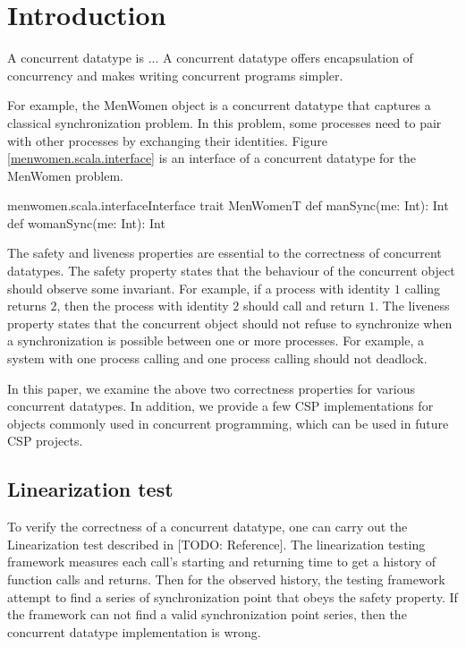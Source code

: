 \documentclass{article}
\begin{document}
\section{Introduction}
A concurrent datatype is ... A concurrent datatype offers encapsulation of concurrency and makes writing concurrent programs simpler. 

For example, the MenWomen object is a concurrent datatype that captures a classical synchronization problem. In this problem, some processes need to pair with other processes by exchanging their identities. Figure \ref{menwomen.scala.interface} is an interface of a concurrent datatype for the MenWomen problem. 

\begin{scalainline}{menwomen.scala.interface}{Interface}
  trait MenWomenT{
    def manSync(me: Int): Int
    def womanSync(me: Int): Int
  }
\end{scalainline}

The safety and liveness properties are essential to the correctness of concurrent datatypes. The safety property states that the behaviour of the concurrent object should observe some invariant. For example, if a process with identity $1$ calling  returns $2$, then the process with identity $2$ should call  and return $1$. The liveness property states that the concurrent object should not refuse to synchronize when a synchronization is possible between one or more processes. For example, a system with one process calling  and one process calling  should not deadlock.

In this paper, we examine the above two correctness properties for various concurrent datatypes. In addition, we provide a few CSP implementations for objects commonly used in concurrent programming, which can be used in future CSP projects.

\subsection{Linearization test}
To verify the correctness of a concurrent datatype, one can carry out the Linearization test described in [TODO: Reference]. The linearization testing framework measures each call's starting and returning time to get a history of function calls and returns. Then for the observed history, the testing framework attempt to find a series of synchronization point that obeys the safety property. If the framework can not find a valid synchronization point series, then the concurrent datatype implementation is wrong. 
\end{document}
